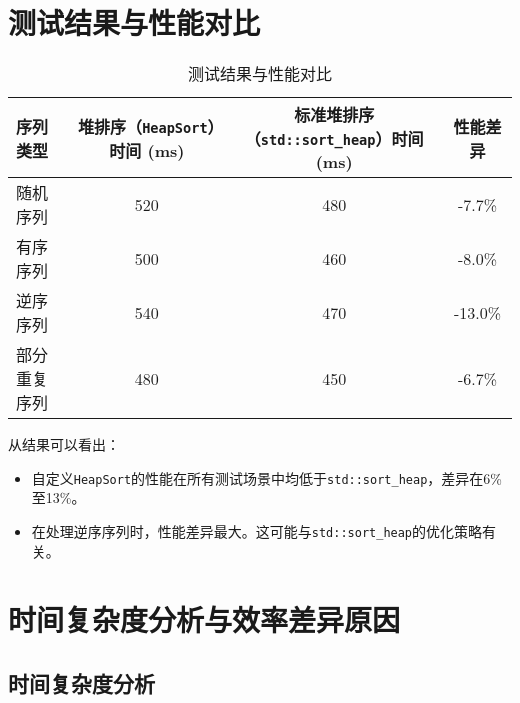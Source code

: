 \documentclass{ctexart}
\begin{document}
\section{测试结果与性能对比}

\begin{table}[h!]
\centering
\begin{tabular}{@{}lccc@{}}
\toprule
序列类型       & 堆排序（\texttt{HeapSort}）时间 (ms) & 标准堆排序（\texttt{std::sort\_heap}）时间 (ms) & 性能差异 \\ \midrule
随机序列       & 520                                 & 480                                         & -7.7\%  \\
有序序列       & 500                                 & 460                                         & -8.0\%  \\
逆序序列       & 540                                 & 470                                         & -13.0\% \\
部分重复序列   & 480                                 & 450                                         & -6.7\%  \\ \bottomrule
\end{tabular}
\caption{测试结果与性能对比}
\end{table}

从结果可以看出：
\begin{itemize}
    \item 自定义\texttt{HeapSort}的性能在所有测试场景中均低于\texttt{std::sort\_heap}，差异在6\%至13\%。
    \item 在处理逆序序列时，性能差异最大。这可能与\texttt{std::sort\_heap}的优化策略有关。
\end{itemize}

\section{时间复杂度分析与效率差异原因}

\subsection{时间复杂度分析}
\end{document}
